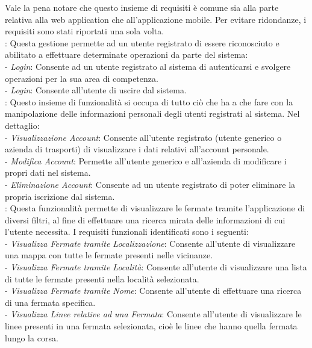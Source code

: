 Vale la pena notare che questo insieme di requisiti \`{e} comune sia alla parte relativa alla web application che all'applicazione mobile. Per evitare ridondanze, i requisiti sono stati riportati una sola volta.\\

: Questa gestione permette ad un utente registrato di essere riconosciuto e abilitato a effettuare determinate operazioni da parte del sistema:\\

 - \emph{Login}: Consente ad un utente registrato al sistema di autenticarsi e svolgere operazioni per la sua area di competenza.\\
 - \emph{Login}: Consente all’utente di uscire dal sistema.\\

: Questo insieme di funzionalit\`{a} si occupa di tutto ciò che ha a che fare con la manipolazione delle informazioni personali degli utenti registrati al sistema. Nel dettaglio:\\

 - \emph{Visualizzazione Account}: Consente all'utente registrato (utente generico o azienda di trasporti) di visualizzare i dati relativi all’account personale.\\
 - \emph{Modifica Account}: Permette all’utente generico e all’azienda di modificare i propri dati nel sistema.\\
 - \emph{Eliminazione Account}: Consente ad un utente registrato di poter eliminare la propria iscrizione dal sistema.\\

: Questa funzionalit\`{a} permette di visualizzare le fermate tramite l’applicazione di diversi filtri, al fine di effettuare una ricerca mirata delle informazioni di cui l’utente necessita. I requisiti funzionali identificati sono i seguenti:\\

 - \emph{Visualizza Fermate tramite Localizzazione}: Consente all’utente di visualizzare una mappa con tutte le fermate presenti nelle vicinanze.\\
 - \emph{Visualizza Fermate tramite Localit\`{a}}: Consente all’utente di visualizzare una lista di tutte le fermate presenti nella località selezionata.\\
 - \emph{Visualizza Fermate tramite Nome}: Consente all’utente di effettuare una ricerca di una fermata specifica.\\
 - \emph{Visualizza Linee relative ad una Fermata}: Consente all’utente di visualizzare le linee presenti in una fermata selezionata, cioè le linee che hanno quella fermata lungo la corsa.\\

